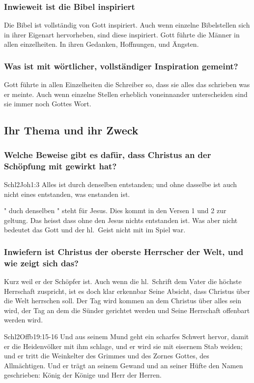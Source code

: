 \subsubsection{Inwieweit ist die Bibel inspiriert}
Die Bibel ist vollständig von Gott inspiriert. Auch wenn einzelne Bibelstellen sich in ihrer Eigenart hervorheben, sind diese inspiriert. Gott führte die Männer in allen einzelheiten. In ihren Gedanken, Hoffnungen, und Ängsten.
\subsubsection{Was ist mit wörtlicher, vollständiger Inspiration gemeint?}
Gott führte in allen Einzelheiten die Schreiber so, dass sie alles das schrieben was er meinte. Auch wenn einzelne Stellen erheblich voneinnander unterscheiden sind sie immer noch Gottes Wort.
\subsection{Ihr Thema und ihr Zweck}
\subsubsection{Welche Beweise gibt es dafür, dass Christus an der Schöpfung mit gewirkt hat?}
\begin{bibeltext}{Schl2}{Joh}{1:3}
	Alles ist durch denselben entstanden; und ohne dasselbe ist auch nicht eines entstanden, was enstanden ist.
\end{bibeltext}
" duch denselben " steht für Jesus. Dies kommt in den Versen 1 und 2 zur geltung. Das heisst dass ohne den Jesus nichts entstanden ist. Was aber nicht bedeutet das Gott und der hl.\ Geist nicht mit im Spiel war.
\subsubsection{Inwiefern ist Christus der oberste Herrscher der Welt, und wie zeigt sich das?}
	Kurz weil er der Schöpfer ist. Auch wenn die hl.\ Schrift dem Vater die höchste Herrschaft zuspricht, ist es doch klar erkennbar Seine Absicht, dass Christus über die Welt herrschen soll. Der Tag wird kommen an dem Christus über alles sein wird, der Tag an dem die Sünder gerichtet werden und Seine Herrschaft offenbart werden wird.
	\begin{bibeltext}{Schl2}{Offb}{19:15-16}
		Und aus seinem Mund geht ein scharfes Schwert hervor, damit er die Heidenvölker mit ihm schlage, und er wird sie mit eisernem Stab weiden; und er tritt die Weinkelter des Grimmes und des Zornes Gottes, des Allmächtigen. Und er trägt an seinem Gewand und an seiner Hüfte den Namen geschrieben: \flqq König der Könige und Herr der Herren\frqq{}.
	\end{bibeltext}
